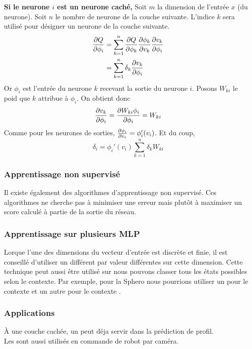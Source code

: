 \textbf{Si le neurone $i$ est un neurone caché,}
Soit $m$ la dimension de l'entrée $x$ (du neurone). Soit $n$ le nombre de neurone de la couche suivante.
L'indice $k$ sera utilisé pour désigner un neurone de la couche suivante.
\begin{equation}
 \begin{split}
  \frac{\partial Q}{\partial \phi_i} & = \sum_{k=1}^{n} \frac{\partial Q}{\partial \phi_k} \frac{\partial \phi_k}{\partial v_k} \frac{\partial v_k}{\partial \phi_i}\\
  ~ & = \sum_{k=1}^{n} \delta_k \frac{\partial v_k}{\partial \phi_i}
 \end{split}
\end{equation}
Or $\phi_i$ est l'entrée du neurone $k$ recevant la sortie du neurone $i$. Posons $W_{ki}$ le poid que $k$ attribue à $\phi_i$.
On obtient donc \[\frac{\partial v_k}{\partial \phi_i} = \frac{\partial W_{ki}\phi_i}{\partial \phi_i} = W_{ki}\]
Comme pour les neurones de sorties, $\frac{\partial \phi_i}{\partial v_i} = \phi_i'(v_i)$.
Et du coup, \[\delta_i = \phi_i'(v_i) \sum_{k=1}^{n} \delta_k W_{ki}\]
\subsubsection{Apprentissage non supervisé}
Il existe également des algorithmes d'apprentissage non supervisé.
Ces algorithmes ne cherche pas à minimiser une erreur mais plutôt à maximiser un score calculé à partie de la sortie du réseau.
\subsubsection{Apprentissage sur plusieurs MLP}
Lorque l'une des dimensions du vecteur d'entrée est discrète et finie, il est conseillé d'utiliser un \mlp différent par valeur différentes sur cette dimension.\cite{Gauthier}
Cette technique peut aussi être utilisé sur nous pouvons classer tous les états possibles selon le contexte.
Par exemple, pour la Sphero nous pourrions utiliser un \mlp pour le contexte  et un autre \mlp pour le contexte .
\subsubsection{Applications}
À une couche cachée, un \mlp peut déja servir dans la prédiction de profil.\cite{statistica}\\
Les \mlp sont aussi utilisés en commande de robot par caméra.\cite{Pomerleau}